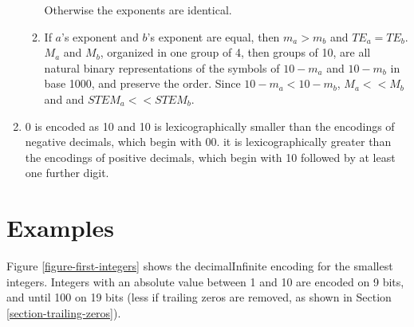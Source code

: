 \documentclass{acm_proc_article-sp}
\begin{document}
\begin{enumerate}
\begin{enumerate}
  Otherwise the exponents are identical.
  \item If $a$'s exponent and $b$'s exponent are equal, then $m_a > m_b$ and $TE_a=TE_b$. $M_a$ and $M_b$, organized in one group of 4, then groups of 10, are all natural binary representations of the symbols of $10-m_a$ and $10-m_b$ in base 1000, and preserve the order. Since $10-m_a < 10-m_b$, $M_a<<M_b$ and and $STEM_a << STEM_b$.
  \end{enumerate}
\item 0 is encoded as 10 and 10 is lexicographically smaller than the encodings of negative decimals, which begin with 00. it is lexicographically greater than the encodings of positive decimals, which begin with 10 followed by at least one further digit.
\end{enumerate}

\section{Examples}
\label{section-examples}

Figure \ref{figure-first-integers} shows the decimalInfinite encoding for the smallest integers. Integers with an absolute value between 1 and 10 are encoded on 9 bits, and until 100 on 19 bits (less if trailing zeros are removed, as shown in Section \ref{section-trailing-zeros}).
\end{document}
